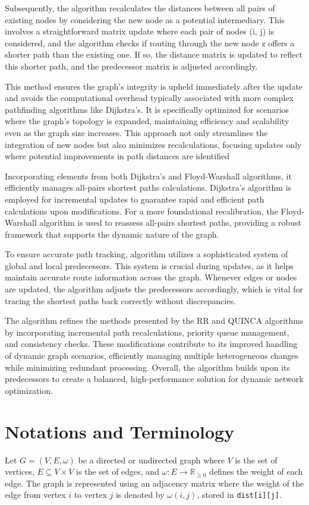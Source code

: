 \documentclass[conference]{IEEEtran}
\begin{document}
Subsequently, the algorithm recalculates the distances between all pairs of existing nodes by considering the new node as a potential intermediary. This involves a straightforward matrix update where each pair of nodes (i, j) is considered, and the algorithm checks if routing through the new node z offers a shorter path than the existing one. If so, the distance matrix is updated to reflect this shorter path, and the predecessor matrix is adjusted accordingly.

This method ensures the graph's integrity is upheld immediately after the update and avoids the computational overhead typically associated with more complex pathfinding algorithms like Dijkstra’s. It is specifically optimized for scenarios where the graph's topology is expanded, maintaining efficiency and scalability even as the graph size increases. This approach not only streamlines the integration of new nodes but also minimizes recalculations, focusing updates only where potential improvements in path distances are identified

Incorporating elements from both Dijkstra's and Floyd-Warshall algorithms, it efficiently manages all-pairs shortest paths calculations. Dijkstra's algorithm is employed for incremental updates to guarantee rapid and efficient path calculations upon modifications. For a more foundational recalibration, the Floyd-Warshall algorithm is used to reassess all-pairs shortest paths, providing a robust framework that supports the dynamic nature of the graph.

To ensure accurate path tracking, algorithm utilizes a sophisticated system of global and local predecessors. This system is crucial during updates, as it helps maintain accurate route information across the graph. Whenever edges or nodes are updated, the algorithm adjusts the predecessors accordingly, which is vital for tracing the shortest paths back correctly without discrepancies.

The algorithm refines the methods presented by the RR and QUINCA algorithms by incorporating incremental path recalculations, priority queue management, and consistency checks. These modifications contribute to its improved handling of dynamic graph scenarios, efficiently managing multiple heterogeneous changes while minimizing redundant processing. Overall, the algorithm builds upon its predecessors to create a balanced, high-performance solution for dynamic network optimization.




\section{Notations and Terminology}
Let \( G = (V, E, \omega) \) be a directed or undirected graph where \( V \) is the set of vertices, \( E \subseteq V \times V \) is the set of edges, and \(\omega: E \rightarrow \mathbb{R}_{\geq 0}\) defines the weight of each edge. The graph is represented using an adjacency matrix where the weight of the edge from vertex \(i\) to vertex \(j\) is denoted by \(\omega(i, j)\), stored in \texttt{dist[i][j]}.
\end{document}
